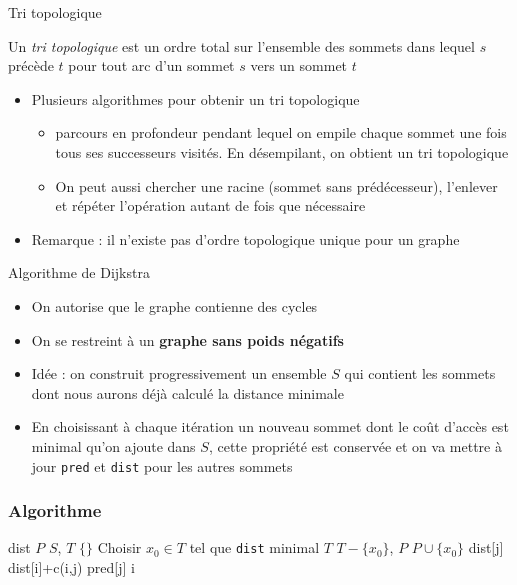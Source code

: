 \begin{frame}{Tri topologique}
    \begin{definition}
        Un \emph{tri topologique} est un ordre total sur l'ensemble des sommets dans lequel $s$ précède $t$ pour tout arc d'un sommet $s$ vers un sommet $t$
    \end{definition}
    \begin{itemize}
        \item Plusieurs algorithmes pour obtenir un tri topologique
        \begin{itemize}
            \item parcours en profondeur pendant lequel on empile chaque sommet une fois tous ses successeurs visités. En désempilant, on obtient un tri topologique
            \item On peut aussi chercher une racine (sommet sans prédécesseur), l'enlever et répéter l'opération autant de fois que nécessaire
        \end{itemize}
        \item Remarque : il n'existe pas d'ordre topologique unique pour un graphe 
    \end{itemize}
\end{frame}




\begin{frame}{Algorithme de Dijkstra}
    \begin{itemize}
        \item On autorise que le graphe contienne des cycles
        \item On se restreint à un \textbf{graphe sans poids négatifs}
        \item Idée : on construit progressivement un ensemble $S$ qui contient les sommets dont nous aurons déjà calculé la distance minimale 
        \item En choisissant à chaque itération un nouveau sommet dont le coût d'accès est minimal qu'on ajoute dans $S$, cette propriété est conservée et on va mettre à jour \texttt{pred} et \texttt{dist} pour les autres sommets
    \end{itemize}
\end{frame}

\begin{frame}[fragile]
    \frametitle{Algorithme}
    \begin{algorithmic}[1]
            \State dist 
            \State $P$ \gets $S$, $T$ \gets $\{\}$
                \State Choisir $x_0 \in T$ tel que \texttt{dist} minimal
                \State $T$ \gets $T-\{ x_0 \}$, $P$ \gets $P \cup \{ x_0 \}$  
                        \State dist[j] \gets dist[i]+c(i,j)
                        \State pred[j] \gets i
                    \EndIf 
                \EndFor
            \EndWhile
        \EndFunction
    \end{algorithmic}
\end{frame}




